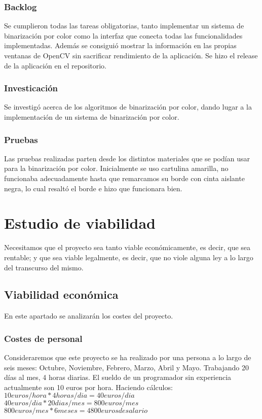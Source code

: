\subsubsection{Backlog}
Se cumplieron todas las tareas obligatorias, tanto implementar un sistema de binarización por color como la interfaz que conecta todas las funcionalidades implementadas. Además se consiguió mostrar la información en las propias ventanas de OpenCV sin sacrificar rendimiento de la aplicación. Se hizo el release de la aplicación en el repositorio.

\subsubsection{Investicación}
Se investigó acerca de los algoritmos de binarización por color, dando lugar a la implementación de un sistema de binarización por color.

\subsubsection{Pruebas}
Las pruebas realizadas parten desde los distintos materiales que se podían usar para la binarización por color. Inicialmente se uso cartulina amarilla, no funcionaba adecuadamente hasta que remarcamos su borde con cinta aislante negra, lo cual resaltó el borde e hizo que funcionara bien.


\section{Estudio de viabilidad}
Necesitamos que el proyecto sea tanto viable económicamente, es decir, que sea rentable; y que sea viable legalmente, es decir, que no viole alguna ley a lo largo del transcurso del mismo. 

\subsection{Viabilidad económica}
En este apartado se analizarán los costes del proyecto.

\subsubsection{Costes de personal}
Consideraremos que este proyecto se ha realizado por una persona a lo largo de seis meses: Octubre, Noviembre, Febrero, Marzo, Abril y Mayo. Trabajando 20 días al mes, 4 horas diarias.
El sueldo de un programador sin experiencia actualmente son 10 euros por hora. Haciendo cálculos:
$10 euros/hora * 4 horas/dia = 40 euros/dia$
$40 euros/dia * 20dias/mes = 800 euros/mes$
$800 euros/mes * 6 meses = 4800 euros de salario$ 

